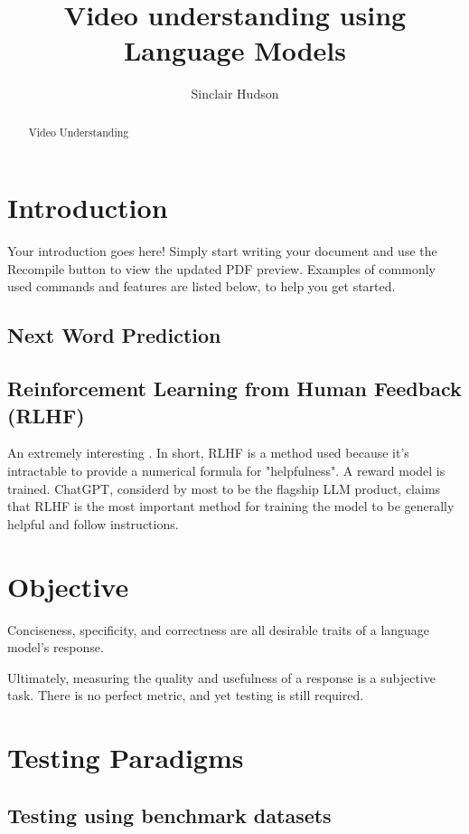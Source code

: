 \documentclass{article}
\title{Video understanding using Language Models}
\author{Sinclair Hudson}
\begin{document}
\maketitle

\begin{abstract}
      Video Understanding
\end{abstract}

\section{Introduction}

Your introduction goes here! Simply start writing your document and use the Recompile button to view the updated PDF preview. Examples of commonly used commands and features are listed below, to help you get started.

\subsection{Next Word Prediction}

\subsection{Reinforcement Learning from Human Feedback (RLHF)}

An extremely interesting .
In short, RLHF is a method used because it's intractable to provide a numerical formula for "helpfulness".
A reward model is trained.
ChatGPT, considerd by most to be the flagship LLM product, claims that RLHF is the most important method for training the model to be generally helpful and follow instructions.

\section{Objective}

Conciseness, specificity, and correctness are all desirable traits of a language model's response.

Ultimately, measuring the quality and usefulness of a response is a subjective task. 
There is no perfect metric, and yet testing is still required.

\section{Testing Paradigms}

\subsection{Testing using benchmark datasets}
\end{document}
